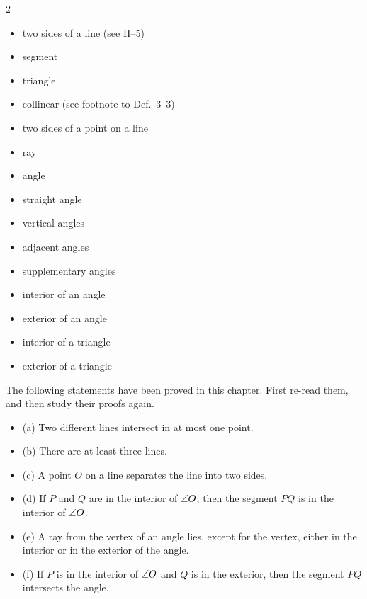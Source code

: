 \documentclass[11pt]{book}
\theoremstyle{bkplain}
\begin{document}
\begin{multicols}{2}
\begin{itemize}[label=,leftmargin=1.2em,itemsep=0pt,topsep=2pt]
\item two sides of a line (see II--5)
\item segment
\item triangle
\item collinear (see footnote to Def.~3--3)
\item two sides of a point on a line
\item ray
\item angle
\item straight angle
\item vertical angles
\item adjacent angles
\item supplementary angles
\item interior of an angle
\item exterior of an angle
\item interior of a triangle
\item exterior of a triangle
\end{itemize}
\end{multicols}

\begin{exlist}[start=3]
\item The following statements have been proved in this chapter. First re-read
      them, and then study their proofs again.
      \begin{itemize}[label=,leftmargin=1.4em,itemsep=1pt,topsep=2pt]
      \item (a) Two different lines intersect in at most one point.
      \item (b) There are at least three lines.
      \item (c) A point $O$ on a line separates the line into two sides.
      \item (d) If $P$ and $Q$ are in the interior of $\angle O$, then the segment
            $PQ$ is in the interior of $\angle O$.
      \item (e) A ray from the vertex of an angle lies, except for the vertex,
            either in the interior or in the exterior of the angle.
      \item (f) If $P$ is in the interior of $\angle O$ and $Q$ is in the
            exterior, then the segment $PQ$ intersects the angle.
      \end{itemize}
\end{exlist}
\end{document}
